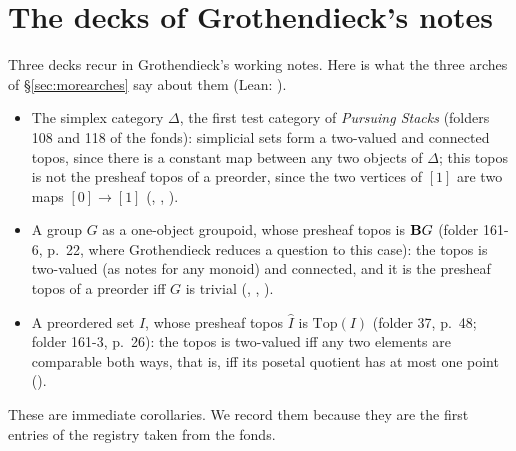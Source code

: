 \section{The decks of Grothendieck's notes}\label{sec:grdecks}

Three decks recur in Grothendieck's working notes. Here is what the three arches of \S\ref{sec:morearches} say about them (Lean: ).
\begin{itemize}
\item The simplex category $\Delta$, the first test category of \emph{Pursuing Stacks} (folders 108 and 118 of the fonds): simplicial sets form a two-valued and connected topos, since there is a constant map between any two objects of $\Delta$; this topos is not the presheaf topos of a preorder, since the two vertices of $[1]$ are two maps $[0]\to[1]$ (, , ).
\item A group $G$ as a one-object groupoid, whose presheaf topos is $\mathbf{B} G$ (folder 161-6, p.~22, where Grothendieck reduces a question to this case): the topos is two-valued (as \cite[IV~8.4.3]{sga4} notes for any monoid) and connected, and it is the presheaf topos of a preorder iff $G$ is trivial (, , ).
\item A preordered set $I$, whose presheaf topos $\widehat I$ is $\mathrm{Top}(I)$ (folder 37, p.~48; folder 161-3, p.~26): the topos is two-valued iff any two elements are comparable both ways, that is, iff its posetal quotient has at most one point ().
\end{itemize}
These are immediate corollaries. We record them because they are the first entries of the registry taken from the fonds.
